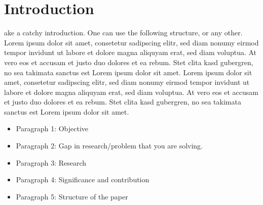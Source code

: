 %
%
\let\textcircled=\pgftextcircled
\chapter{Introduction}
\label{chap:intro}

ake a catchy introduction. One can use the following structure, or any other. Lorem ipsum dolor sit amet, consetetur sadipscing elitr, sed diam nonumy eirmod tempor invidunt ut labore et dolore magna aliquyam erat, sed diam voluptua. At vero eos et accusam et justo duo dolores et ea rebum. Stet clita kasd gubergren, no sea takimata sanctus est Lorem ipsum dolor sit amet. Lorem ipsum dolor sit amet, consetetur sadipscing elitr, sed diam nonumy eirmod tempor invidunt ut labore et dolore magna aliquyam erat, sed diam voluptua. At vero eos et accusam et justo duo dolores et ea rebum. Stet clita kasd gubergren, no sea takimata sanctus est Lorem ipsum dolor sit amet.\\

\begin{itemize}
	\item Paragraph 1: Objective
	\item Paragraph 2: Gap in research/problem that you are solving.
	\item Paragraph 3: Research
	\item Paragraph 4: Significance and contribution
	\item Paragraph 5: Structure of the paper
\end{itemize}

